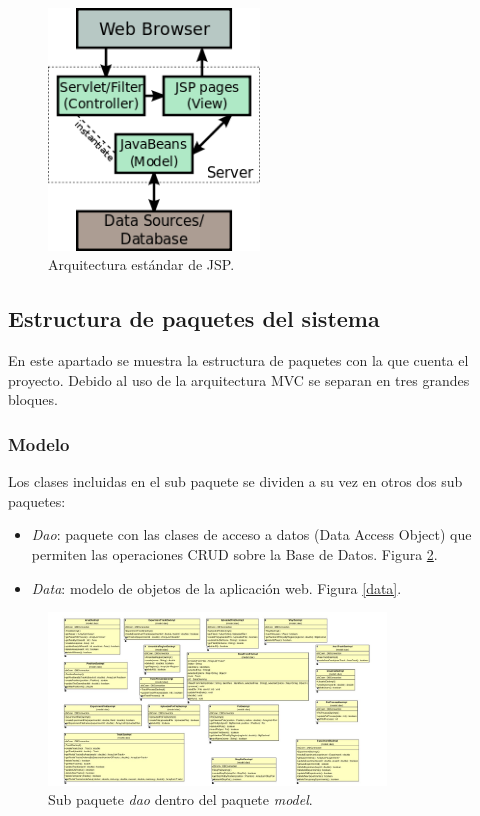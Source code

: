 \begin{figure}[!htbp]
  \centering
    \includegraphics[width=0.5\textwidth]{../img/jsp/jsp.png}
  \caption{Arquitectura estándar de JSP.}
  \label{jsp}
\end{figure}

\subsection{Estructura de paquetes del sistema}
En este apartado se muestra la estructura de paquetes con la que cuenta el proyecto. Debido al uso de la arquitectura MVC se separan en tres grandes bloques.

\subsubsection{Modelo}
Los clases incluidas en el sub paquete  se dividen a su vez en otros dos sub paquetes:

\begin{itemize}
	\item \textit{Dao}: paquete con las clases de acceso a datos (Data Access Object) que permiten las operaciones CRUD sobre la Base de Datos. Figura \ref{dao}.
	\item \textit{Data}: modelo de objetos de la aplicación web. Figura \ref{data}.
\end{itemize}

\begin{figure}[!htbp]
  \centering
    \includegraphics[width=0.8\textwidth]{../img/diagramas/model/dao/uno.jpg}
  \caption{Sub paquete \textit{dao} dentro del paquete \textit{model}.}
  \label{dao}
\end{figure}


